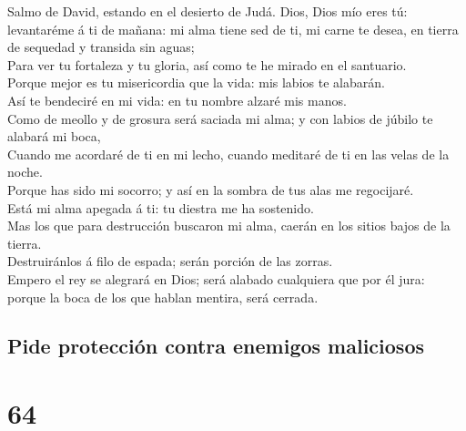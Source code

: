  Salmo de David, estando en el desierto de Judá. Dios,
Dios mío eres tú: levantaréme á ti de mañana: mi alma tiene sed de ti,
mi carne te desea, en tierra de sequedad y transida sin aguas;\\
 Para ver tu fortaleza y tu gloria, así como te he mirado
en el santuario.\\
 Porque mejor es tu misericordia que la vida: mis labios
te alabarán.\\
 Así te bendeciré en mi vida: en tu nombre alzaré mis
manos.\\
 Como de meollo y de grosura será saciada mi alma; y con
labios de júbilo te alabará mi boca,\\
 Cuando me acordaré de ti en mi lecho, cuando meditaré de
ti en las velas de la noche.\\
 Porque has sido mi socorro; y así en la sombra de tus
alas me regocijaré.\\
 Está mi alma apegada á ti: tu diestra me ha sostenido.\\
 Mas los que para destrucción buscaron mi alma, caerán en
los sitios bajos de la tierra.\\
 Destruiránlos á filo de espada; serán porción de las
zorras.\\
 Empero el rey se alegrará en Dios; será alabado
cualquiera que por él jura: porque la boca de los que hablan mentira,
será cerrada.

\hypertarget{pide-protecciuxf3n-contra-enemigos-maliciosos}{%
\subsection{Pide protección contra enemigos
maliciosos}\label{pide-protecciuxf3n-contra-enemigos-maliciosos}}

\hypertarget{section-19-64}{%
\section{64}\label{section-19-64}}

